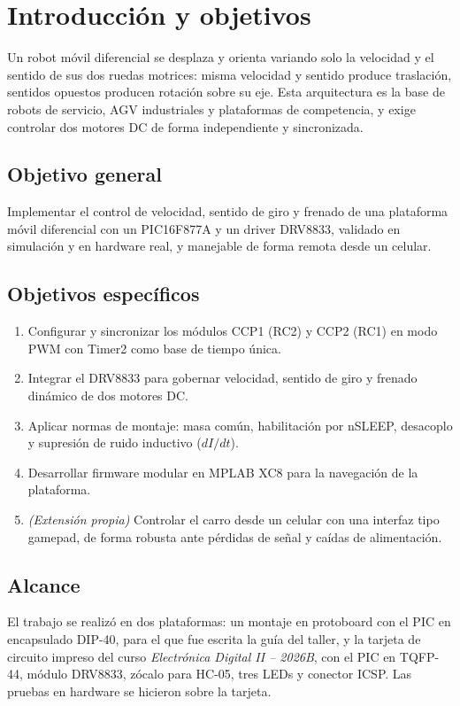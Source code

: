 \section{Introducción y objetivos}
\label{sec:introduccion}

Un robot móvil diferencial se desplaza y orienta variando solo la velocidad y
el sentido de sus dos ruedas motrices: misma velocidad y sentido produce
traslación, sentidos opuestos producen rotación sobre su eje. Esta
arquitectura es la base de robots de servicio, AGV industriales y plataformas
de competencia, y exige controlar dos motores DC de forma independiente y
sincronizada.

\subsection*{Objetivo general}
Implementar el control de velocidad, sentido de giro y frenado de una
plataforma móvil diferencial con un PIC16F877A y un driver DRV8833, validado en
simulación y en hardware real, y manejable de forma remota desde un celular.

\subsection*{Objetivos específicos}
\begin{enumerate}
  \item Configurar y sincronizar los módulos CCP1 (RC2) y CCP2 (RC1) en modo
        PWM con Timer2 como base de tiempo única.
  \item Integrar el DRV8833 para gobernar velocidad, sentido de giro y frenado
        dinámico de dos motores DC.
  \item Aplicar normas de montaje: masa común, habilitación por nSLEEP,
        desacoplo y supresión de ruido inductivo ($dI/dt$).
  \item Desarrollar firmware modular en MPLAB XC8 para la navegación de la
        plataforma.
  \item \emph{(Extensión propia)} Controlar el carro desde un celular con
        una interfaz tipo gamepad, de forma robusta ante pérdidas de señal y
        caídas de alimentación.
\end{enumerate}

\subsection*{Alcance}
El trabajo se realizó en dos plataformas: un montaje en protoboard con el PIC
en encapsulado DIP-40, para el que fue escrita la guía del taller, y la
tarjeta de circuito impreso del curso \emph{Electrónica Digital II -- 2026B},
con el PIC en TQFP-44, módulo DRV8833, zócalo para HC-05, tres LEDs y conector
ICSP. Las pruebas en hardware se hicieron sobre la tarjeta.
